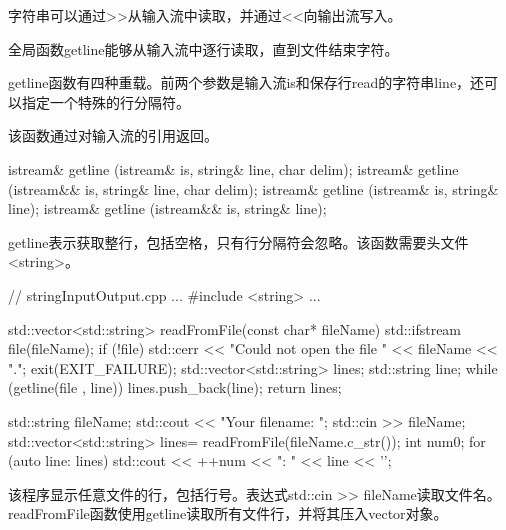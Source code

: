 字符串可以通过>{}>从输入流中读取，并通过<{}<向输出流写入。

全局函数getline能够从输入流中逐行读取，直到文件结束字符。

getline函数有四种重载。前两个参数是输入流is和保存行read的字符串line，还可以指定一个特殊的行分隔符。

该函数通过对输入流的引用返回。

\begin{cpp}
istream& getline (istream& is, string& line, char delim);
istream& getline (istream&& is, string& line, char delim);
istream& getline (istream& is, string& line);
istream& getline (istream&& is, string& line);
\end{cpp}

getline表示获取整行，包括空格，只有行分隔符会忽略。该函数需要头文件<string>。


\begin{cpp}
// stringInputOutput.cpp
...
#include <string>
...

std::vector<std::string> readFromFile(const char* fileName){
	std::ifstream file(fileName);
	if (!file){
		std::cerr << "Could not open the file " << fileName << ".";
		exit(EXIT_FAILURE);
	}
	std::vector<std::string> lines;
	std::string line;
	while (getline(file , line)) lines.push_back(line);
	return lines;
}

std::string fileName;
std::cout << "Your filename: ";
std::cin >> fileName;
std::vector<std::string> lines= readFromFile(fileName.c_str());
int num{0};
for (auto line: lines) std::cout << ++num << ": " << line << '\n';
\end{cpp}

该程序显示任意文件的行，包括行号。表达式std::cin >{}> fileName读取文件名。readFromFile函数使用getline读取所有文件行，并将其压入vector对象。


































